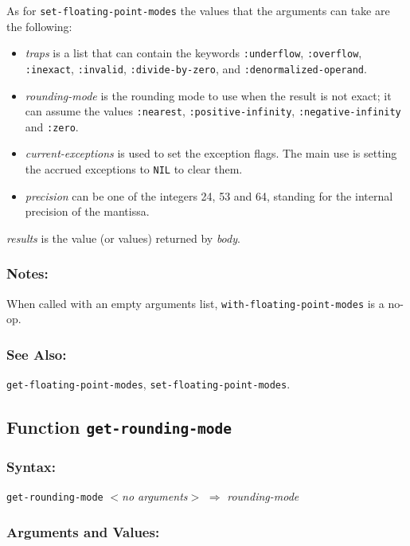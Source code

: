\documentclass[fleqn]{article}
\newcommand{\code}[1]{\texttt{#1}}
\newcommand{\varname}[1]{\textit{#1}}
\newcommand{\DDictionaryItem}[1]{\vspace*{6pt}\noindent\hrulefill\vspace*{-9pt}\subsection*{#1}}
\newcommand{\DArgsNValues}{\subsubsection*{Arguments and Values:}}
\begin{document}
As for \code{set-floating-point-modes} the values that the arguments
can take are the following:

\begin{itemize}
\item \varname{traps} is a list that can contain the keywords
  \code{:underflow}, \code{:overflow}, \code{:inexact}, \code{:invalid},
  \code{:divide-by-zero}, and \code{:denormalized-operand}.

\item \varname{rounding-mode} is the rounding mode to use when the result is
  not exact; it can assume the values \code{:nearest},
  \code{:positive-infinity}, \code{:negative-infinity} and
  \code{:zero}.

\item \varname{current-exceptions} is used to set the exception flags. The
  main use is setting the accrued exceptions to \code{NIL} to clear
  them.

\item \varname{precision} can be one of the integers 24, 53 and 64,
  standing for the internal precision of the mantissa.
\end{itemize}



\noindent
\varname{results} is the value (or values) returned by \varname{body}.


\subsubsection*{Notes:}

When called with an empty arguments list,
\code{with-floating-point-modes} is a no-op.


\subsubsection*{See Also:}

\code{get-floating-point-modes}, \code{set-floating-point-modes}.


\DDictionaryItem{Function \code{get-rounding-mode}}

\subsubsection*{Syntax:}

\code{get-rounding-mode} \textit{$<$no arguments$>$}
$\Rightarrow$ \varname{rounding-mode}

\DArgsNValues{}
\end{document}
